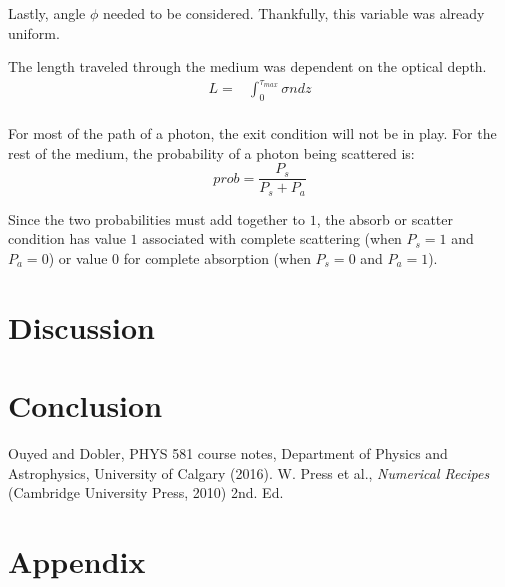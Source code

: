 \documentclass[twocolumn]{article}
\begin{document}
Lastly, angle $\phi$ needed to be considered. Thankfully, this variable was already uniform.

The length traveled through the medium was dependent on the optical depth.
\begin{equation}
\begin{split}
L =& \int_{0}^{\tau_{max}}\sigma n dz \\
\end{split}
\end{equation}

For most of the path of a photon, the exit condition will not be in play. For the rest of the medium, the probability of a photon being scattered is:
\begin{equation}
prob = \frac{P_s}{P_s + P_a}
\end{equation}

Since the two probabilities must add together to $1$, the absorb or scatter condition has value $1$ associated with complete scattering (when $P_s = 1$ and $P_a=0$) or value $0$ for complete absorption (when $P_s = 0$ and $P_a=1$).
\section{Discussion}


\section{Conclusion}

\begin{thebibliography}{00}
	Ouyed and Dobler, PHYS 581 course notes, Department of Physics and Astrophysics, University of Calgary (2016).
	W. Press et al., \emph{Numerical Recipes} (Cambridge University Press, 2010) 2nd. Ed.
\end{thebibliography}

\section{Appendix}

	
\end{document}
